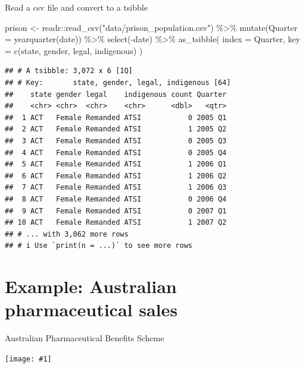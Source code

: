 \documentclass[14pt,ignorenonframetext,aspectratio=169]{beamer}
\newenvironment{Shaded}{\begin{snugshade}}{\end{snugshade}}
\newcommand{\AttributeTok}[1]{\textcolor[rgb]{0.77,0.63,0.00}{#1}}
\newcommand{\FunctionTok}[1]{\textcolor[rgb]{0.00,0.00,0.00}{#1}}
\newcommand{\NormalTok}[1]{#1}
\newcommand{\OtherTok}[1]{\textcolor[rgb]{0.56,0.35,0.01}{#1}}
\newcommand{\SpecialCharTok}[1]{\textcolor[rgb]{0.00,0.00,0.00}{#1}}
\newcommand{\StringTok}[1]{\textcolor[rgb]{0.31,0.60,0.02}{#1}}
\renewenvironment{Shaded}{\color{black}\begin{snugshade}\color{black}}{\end{snugshade}}
\renewenvironment{Shaded}{\color{black}\fontsize{10}{10}\sf\begin{snugshade}\color{black}}{\end{snugshade}}
\def\fullwidth#1{\centerline{\texttt{[image: \#1]}}}
\begin{document}
\begin{frame}[fragile]{Read a csv file and convert to a tsibble}
\protect\hypertarget{read-a-csv-file-and-convert-to-a-tsibble-3}{}
\fontsize{10}{11}\sf

\begin{Shaded}
\begin{Highlighting}[]
\NormalTok{prison }\OtherTok{\textless{}{-}}\NormalTok{ readr}\SpecialCharTok{::}\FunctionTok{read\_csv}\NormalTok{(}\StringTok{"data/prison\_population.csv"}\NormalTok{) }\SpecialCharTok{\%\textgreater{}\%}
  \FunctionTok{mutate}\NormalTok{(}\AttributeTok{Quarter =} \FunctionTok{yearquarter}\NormalTok{(date)) }\SpecialCharTok{\%\textgreater{}\%}
  \FunctionTok{select}\NormalTok{(}\SpecialCharTok{{-}}\NormalTok{date) }\SpecialCharTok{\%\textgreater{}\%}
  \FunctionTok{as\_tsibble}\NormalTok{(}
    \AttributeTok{index =}\NormalTok{ Quarter,}
    \AttributeTok{key =} \FunctionTok{c}\NormalTok{(state, gender, legal, indigenous)}
\NormalTok{  )}
\end{Highlighting}
\end{Shaded}

\begin{verbatim}
## # A tsibble: 3,072 x 6 [1Q]
## # Key:       state, gender, legal, indigenous [64]
##    state gender legal    indigenous count Quarter
##    <chr> <chr>  <chr>    <chr>      <dbl>   <qtr>
##  1 ACT   Female Remanded ATSI           0 2005 Q1
##  2 ACT   Female Remanded ATSI           1 2005 Q2
##  3 ACT   Female Remanded ATSI           0 2005 Q3
##  4 ACT   Female Remanded ATSI           0 2005 Q4
##  5 ACT   Female Remanded ATSI           1 2006 Q1
##  6 ACT   Female Remanded ATSI           1 2006 Q2
##  7 ACT   Female Remanded ATSI           1 2006 Q3
##  8 ACT   Female Remanded ATSI           0 2006 Q4
##  9 ACT   Female Remanded ATSI           0 2007 Q1
## 10 ACT   Female Remanded ATSI           1 2007 Q2
## # ... with 3,062 more rows
## # i Use `print(n = ...)` to see more rows
\end{verbatim}
\end{frame}

\hypertarget{example-australian-pharmaceutical-sales}{%
\section{Example: Australian pharmaceutical
sales}\label{example-australian-pharmaceutical-sales}}

\begin{frame}{Australian Pharmaceutical Benefits Scheme}
\protect\hypertarget{australian-pharmaceutical-benefits-scheme}{}
\fullwidth{pills}
\end{frame}
\end{document}
